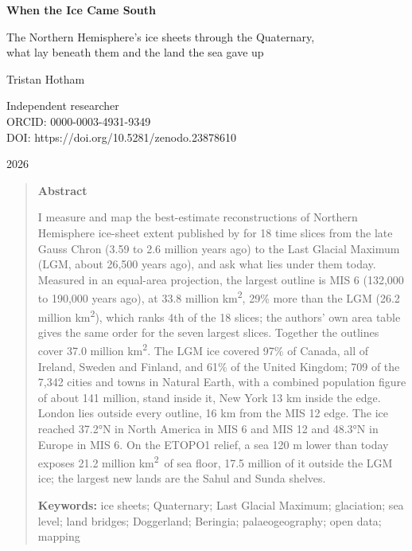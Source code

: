 \documentclass[11pt,a4paper]{article}
\newcommand{\kmq}{km\textsuperscript{2}}
\begin{document}
\begin{center}
{\Large\bfseries When the Ice Came South\par}
\vspace{0.4em}
{\large The Northern Hemisphere's ice sheets through the Quaternary,\\what lay beneath them and the land the sea gave up\par}
\vspace{1.2em}
{\large Tristan Hotham\par}
\vspace{0.3em}
{\small Independent researcher\\
ORCID: 0000-0003-4931-9349\\
DOI: https://doi.org/10.5281/zenodo.23878610\par}
\vspace{0.8em}
2026
\end{center}

\begin{quote}
\small
\begin{center}\textbf{Abstract}\end{center}
I measure and map the best-estimate reconstructions of Northern Hemisphere ice-sheet extent published by \citet{batchelor} for 18 time slices from the late Gauss Chron (3.59 to 2.6 million years ago) to the Last Glacial Maximum (LGM, about 26,500 years ago), and ask what lies under them today. Measured in an equal-area projection, the largest outline is MIS 6 (132,000 to 190,000 years ago), at 33.8 million \kmq, 29\% more than the LGM (26.2 million \kmq), which ranks 4th of the 18 slices; the authors' own area table gives the same order for the seven largest slices. Together the outlines cover 37.0 million \kmq. The LGM ice covered 97\% of Canada, all of Ireland, Sweden and Finland, and 61\% of the United Kingdom; 709 of the 7,342 cities and towns in Natural Earth, with a combined population figure of about 141 million, stand inside it, New York 13 km inside the edge. London lies outside every outline, 16 km from the MIS 12 edge. The ice reached 37.2°N in North America in MIS 6 and MIS 12 and 48.3°N in Europe in MIS 6. On the ETOPO1 relief, a sea 120 m lower than today exposes 21.2 million \kmq\ of sea floor, 17.5 million of it outside the LGM ice; the largest new lands are the Sahul and Sunda shelves.

\textbf{Keywords:} ice sheets; Quaternary; Last Glacial Maximum; glaciation; sea level; land bridges; Doggerland; Beringia; palaeogeography; open data; mapping
\end{quote}
\end{document}
